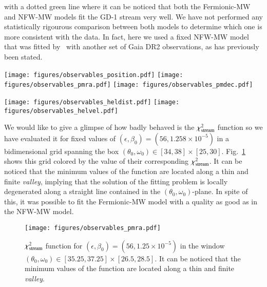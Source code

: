 \documentclass[twocolumn]{aa}
\begin{document}
with a dotted green line where it can be noticed that both the Fermionic-MW and NFW-MW models
fit the GD-1 stream very well.
We have not performed any statistically rigourous comparison between both models to determine which one is
more consistent with the data. In fact, here we used a fixed NFW-MW model that was fitted by~\citet{2019MNRAS.486.2995M} with another set of Gaia DR2 observations, as has previously been stated.\\
%
\begin{figure*}
   \centering
   \texttt{[image: figures/observables\_position.pdf]}
   \texttt{[image: figures/observables\_pmra.pdf]}
   \texttt{[image: figures/observables\_pmdec.pdf]}
   \caption{Stream fits in astrometric observable space: sky position (top: $\phi_2$) and proper motions (middle: $\tilde{\mu}_\alpha$, bottom: $\mu_\delta$).}
   \label{fig:obs_pos}
\end{figure*}
\begin{figure*}
   \texttt{[image: figures/observables\_heldist.pdf]}
   \texttt{[image: figures/observables\_helvel.pdf]}
   \caption{Stream fits in observable space: photometric distance (top: $D$) and
   spectroscopic heliocentric velocity (bottom: $v_h$).}
   \label{fig:obs_vel}
\end{figure*}
%
We would like to give a glimpse of how badly behaved is the $\chi^2_{\rm{stream}}$ function so we have evaluated it for fixed values of $(\epsilon, \beta_0)=(56, 1.258\times10^{-5})$ in a bidimensional grid
spanning the box $(\theta_0, \omega_0)\in[34, 38]\times[25, 30]$.
Fig.~\ref{fig:chi2stream} shows this grid colored by the value of their corresponding $\chi^2_{\rm{stream}}$.
It can be noticed that the minimum values of the function are located along a thin and finite {\it valley}, implying that the solution of the fitting problem is locally degenerated along
a straight line contained in the $(\theta_0, \omega_0)$-plane. In spite of this, it was possible
to fit the Fermionic-MW model with a quality as good as in the NFW-MW model.


\begin{figure}
   \centering
   \texttt{[image: figures/observables\_pmra.pdf]}
   \caption{$\chi^2_{\rm{stream}}$ function for $(\epsilon, \beta_0)=(56, 1.25\times10^{-5})$ in
   the window $(\theta_0, \omega_0)\in[35.25, 37.25]\times[26.5, 28.5]$. It can be noticed that
   the minimum values of the function are located along a thin and finite {\it valley}.}
   \label{fig:chi2stream}
\end{figure}
\end{document}
